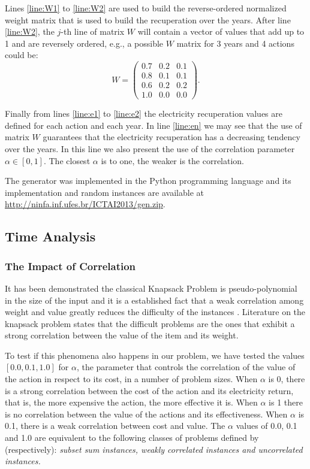 Lines \ref{line:W1} to \ref{line:W2} are used to build the reverse-ordered normalized weight matrix that is used to 
build the recuperation over the years. After line \ref{line:W2}, the $j$-th line of matrix $W$ will contain
a vector of values that add up to 1 and are reversely ordered, e.g., a possible $W$ matrix for 3 years and 4 actions
could be:
\[ W = \left( \begin{array}{ccc}
0.7 & 0.2 & 0.1 \\
0.8 & 0.1 & 0.1 \\
0.6 & 0.2 & 0.2 \\
1.0 & 0.0 & 0.0 \end{array} \right).\] 

Finally from lines \ref{line:e1} to \ref{line:e2} the electricity recuperation values are defined for each action
and each year. In line \ref{line:en} we may see that the use of matrix $W$ guarantees that the electricity recuperation has a decreasing tendency
over the years. In this line we also present the use of the correlation parameter $\alpha \in [0,1]$.
The closest $\alpha$ is to one, the weaker is the correlation.

The generator was implemented in the Python programming language and its implementation 
and random instances are available at \url{http://ninfa.inf.ufes.br/ICTAI2013/gen.zip}.

\subsection{Time Analysis}

\subsubsection{The Impact of Correlation}                      
It has been demonstrated the classical  Knapsack Problem is pseudo-polynomial
in the size of the input \cite{garey1978} and it is a established
fact that a weak correlation among weight and value greatly reduces the difficulty of the instances \cite{david2005}.
Literature on the knapsack problem states that the difficult problems are the ones that exhibit 
a strong correlation between the value of the item and its weight.

To test if this phenomena also happens in our problem, we have tested the values $[0.0, 0.1, 1.0]$ for $\alpha$,
the parameter that controls the correlation of the value of the action in respect to its cost, 
in a number of problem sizes. When $\alpha$ is 0,
there is a strong correlation between the cost of the action and its electricity return, that is,
the more expensive the action, the more effective it is. When $\alpha$ is 1 there is no correlation
between the value of the actions and its effectiveness. When $\alpha$ is 0.1, there is a weak correlation between cost and value.
The $\alpha$ values of 0.0, 0.1 and 1.0 are equivalent to the following classes of problems defined by \cite{david2005} (respectively): 
\textit{subset sum instances, weakly correlated instances and uncorrelated instances.}

